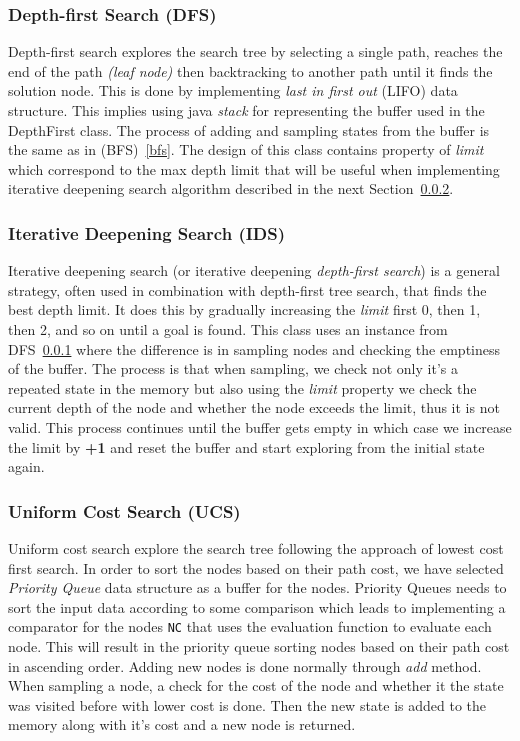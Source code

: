 \documentclass{article}
\newcommand{\code}[1]{\colorbox{codegray}{\texttt{#1}}}
\begin{document}
\subsubsection{Depth-first Search (DFS)}\label{dfs}
Depth-first search explores the search tree by selecting a single path, reaches the end of the path \textit{(leaf node)} then backtracking to another path until it finds the solution node. This is done by implementing \textit{last in first out} (LIFO) data structure. This implies using java \textit{stack} for representing the buffer used in the DepthFirst class. The process of adding and sampling states from the buffer is the same as in (BFS)~\ref{bfs}. The design of this class contains property of \textit{limit} which correspond to the max depth limit that will be useful when implementing iterative deepening search algorithm described in the next Section~\ref{ids}.
\subsubsection{Iterative Deepening Search (IDS)}\label{ids}
Iterative deepening search (or iterative deepening \textit{depth-first search}) is a general strategy, often used in combination with depth-first tree search, that finds the best depth limit. It does this by gradually increasing the \textit{limit} first 0, then 1, then 2, and so on until a goal is found. This class uses an instance from DFS~\ref{dfs} where the difference is in sampling nodes and checking the emptiness of the buffer. The process is that when sampling, we check not only it's a repeated state in the memory but also using the \textit{limit} property we check the current depth of the node and whether the node exceeds the limit, thus it is not valid. This process continues until the buffer gets empty in which case we increase the limit by \textbf{+1} and reset the buffer and start exploring from the initial state again.

\subsubsection{Uniform Cost Search (UCS)}\label{ucs}
Uniform cost search explore the search tree following the approach of lowest cost first search. In order to sort the nodes based on their path cost, we have selected \textit{Priority Queue} data structure as a buffer for the nodes. Priority Queues needs to sort the input data according to some comparison which leads to implementing a comparator for the nodes \code{NC} that uses the evaluation function to evaluate each node. This will result in the priority queue sorting nodes based on their path cost in ascending order. Adding new nodes is done normally through \textit{add} method. When sampling a node, a check for the cost of the node and whether it the state was visited before with lower cost is done. Then the new state is added to the memory along with it's cost and a new node is returned.
\end{document}
